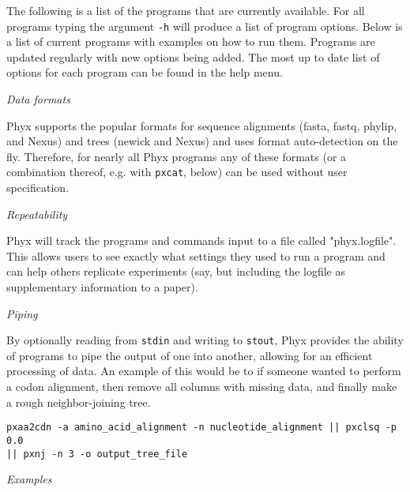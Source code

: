 \documentclass[12pt,letterpaper]{article}
\renewcommand{\subsection}[1]{%
\bigskip
\begin{center}
\begin{large}
\normalfont\itshape #1
\end{large}
\end{center}}
\begin{document}
The following is a list of the programs that are currently available. For all programs typing the argument \texttt{-h} will produce a list of program options. Below is a list of current programs with examples on how to run them. Programs are updated regularly with new options being added. The most up to date list of options for each program can be found in the help menu.

\subsection{Data formats}

Phyx supports the popular formats for sequence alignments (fasta, fastq, phylip, and Nexus) and trees (newick and Nexus) and uses format auto-detection on the fly. Therefore, for nearly all Phyx programs any of these formats (or a combination thereof, e.g. with \texttt{pxcat}, below) can be used without user specification.


\subsection{Repeatability}

Phyx will track the programs and commands input to a file called "phyx.logfile". This allows users to see exactly what settings they used to run a program and can help others replicate experiments (say, but including the logfile as supplementary information to a paper).

\subsection{Piping}

By optionally reading from \texttt{stdin} and writing to \texttt{stout}, Phyx provides the ability of programs to pipe the output of one into another, allowing for an efficient processing of data. An example of this would be to if someone wanted to perform a codon alignment, then remove all columns with missing data, and finally make a rough neighbor-joining tree.
\begin{flushleft}
\begin{verbatim}
pxaa2cdn -a amino_acid_alignment -n nucleotide_alignment || pxclsq -p 0.0 
|| pxnj -n 3 -o output_tree_file
\end{verbatim}
\end{flushleft}

\subsection{Examples}
\end{document}
